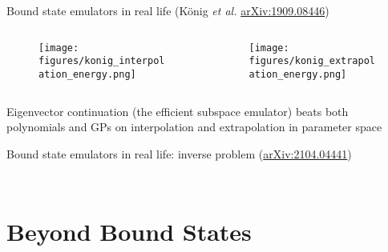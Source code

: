 \documentclass[xcolor=dvipsnames, aspectratio=169]{beamer}
\begin{document}
\begin{frame}{Bound state emulators in real life (\alert{K\"onig \emph{et al.} \href{https://arxiv.org/abs/1909.08446}{arXiv:1909.08446}})}
\begin{columns}
\begin{column}{0.5\textwidth}
\begin{figure}
\texttt{[image: figures/konig\_interpolation\_energy.png]}
\end{figure}
\end{column}
\begin{column}{0.5\textwidth}
\begin{figure}
\texttt{[image: figures/konig\_extrapolation\_energy.png]}
\end{figure}
\end{column}
\end{columns}
Eigenvector continuation (the efficient subspace emulator) beats both polynomials and GPs on interpolation and extrapolation in parameter space
\end{frame}


\begin{frame}{Bound state emulators in real life: inverse problem (\alert{\href{https://arxiv.org/abs/2104.04441}{arXiv:2104.04441}})}
\begin{columns}[t]
\begin{column}{0.5\textwidth}
\begin{figure}
\end{figure}
\end{column}
\begin{column}{0.5\textwidth}
\begin{figure}
\end{figure}
\end{column}
\end{columns}
\end{frame}


\section{Beyond Bound States}
\end{document}
